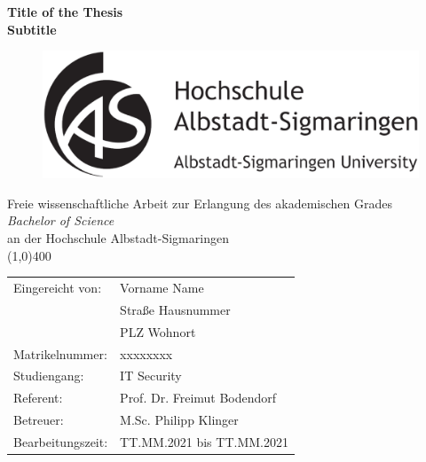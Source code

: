 \documentclass[12pt]{article}
\begin{document}
\begin{center}
	\vspace{3cm}
	\Large\textbf{Title of the Thesis}\\
	\vspace{1cm}
	\normalsize\textbf{Subtitle}
	\vspace{3cm}


	\begin{figure}[!h]
		\centering
		\includegraphics[scale=0.19]{hsalbsigNAME}
	\end{figure}

	\vspace{3cm}
	\small Freie wissenschaftliche Arbeit zur Erlangung des akademischen Grades\\
	\vspace{1cm}
	\small \textit{Bachelor of Science}\\
	\vspace{1cm}
	\small an der Hochschule Albstadt-Sigmaringen\\
	\vspace{4cm}
	\line(1,0){400}
\end{center}

\begin{flushleft}
	\begin{tabular}{ll}
		Eingereicht von: & Vorname Name\\
		 & Straße Hausnummer\\
		 & PLZ Wohnort\\
		Matrikelnummer: & xxxxxxxx\\
		Studiengang: & IT Security\\
		Referent: & Prof. Dr. Freimut Bodendorf\\
		Betreuer: & M.Sc. Philipp Klinger\\
		Bearbeitungszeit: & TT.MM.2021 bis TT.MM.2021\\
	\end{tabular}
\end{flushleft}
\thispagestyle{empty}
\cleardoublepage
\end{document}
